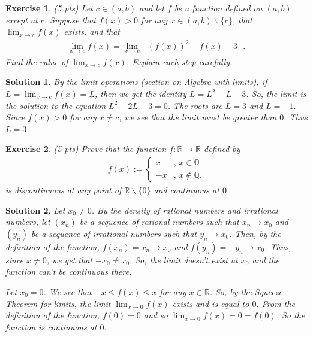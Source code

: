 \documentclass[12pt]{article}
\newcommand{\bR}{\mathbb{R}}
\newcommand{\bQ}{\mathbb{Q}}
\newcommand{\oc}{\left[}
\newcommand{\fc}{\right]}
\newcommand{\ra}{\rightarrow}
\theoremstyle{plain}
\newtheorem{exer}{\textbf{Exercise}}}
\theoremstyle{plain}
\newtheorem*{sol}{\textbf{Solution}}}
\theoremstyle{plain}
\theoremstyle{plain}
\begin{document}
\begin{exer}
(5 pts)
Let $c \in (a, b)$ and let $f$ be a function defined on $(a, b)$ except at $c$. Suppose that $f(x) > 0$ for any $x \in (a, b) \backslash \{ c \}$, that $\lim_{x \ra c} f(x)$ exists, and that
	\begin{align*}
	\lim_{x \ra c} f(x) = \lim_{x \ra c} \oc (f(x))^2 - f(x) - 3 \fc .
	\end{align*} 
Find the value of $\lim_{x \ra c} f(x)$. Explain each step carefully.
\end{exer}
\begin{sol}
By the limit operations (section on Algebra with limits), if $L = \lim_{x \ra c} f(x) = L$, then we get the identity $L = L^2 - L - 3$. So, the limit is the solution to the equation $L^2 - 2L - 3 = 0$. The roots are $L = 3$ and $L = -1$. Since $f(x) > 0$ for any $x \neq c$, we see that the limit must be greater than $0$. Thus $L = 3$.
\end{sol}

\begin{exer}
(5 pts)
Prove that the function $f : \bR \ra \bR$ defined by
	\begin{align*}
	f(x) := \begin{cases}
	x & \text{, } x \in \bQ \\
	-x &  \text{, } x \not\in \bQ .
	\end{cases}
	\end{align*}
is discontinuous at any point of $\bR \backslash \{ 0 \}$ and continuous at $0$.
\end{exer}
\begin{sol}
Let $x_0 \neq 0$. By the density of rational numbers and irrational numbers, let $(x_n)$ be a sequence of rational numbers such that $x_n \ra x_0$ and $(y_n)$ be a sequence of irrational numbers such that $y_n \ra x_0$. Then, by the definition of the function, $f(x_n) = x_n \ra x_0$ and $f(y_n) = -y_n \ra x_0$. Thus, since $x \neq 0$, we get that $-x_0 \neq x_0$. So, the limit doesn't exist at $x_0$ and the function can't be continuous there.

Let $x_0 = 0$. We see that $-x \leq f(x) \leq x$ for any $x \in \bR$. So, by the Squeeze Theorem for limits, the limit $\lim_{x \ra 0} f(x)$ exists and is equal to $0$. From the definition of the function, $f(0) = 0$ and so $\lim_{x \ra 0} f(x) = 0 = f(0)$. So the function is continuous at $0$.
\end{sol}
\end{document}
